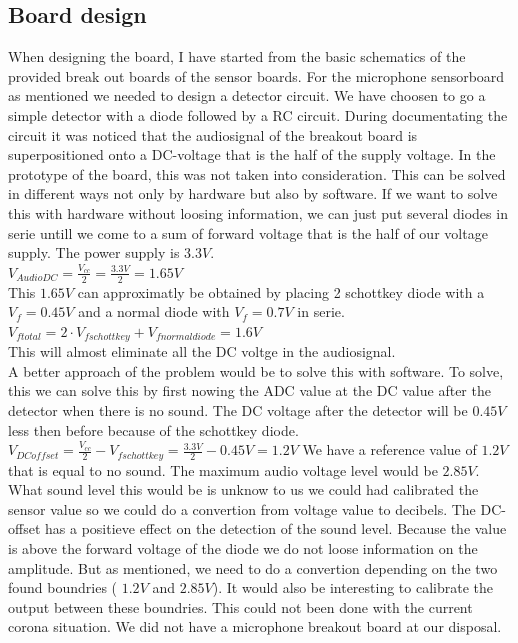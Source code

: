 \documentclass[11pt,a4paper]{article}
\begin{document}
\subsection{Board design}
When designing the board, I have started from the basic schematics of the provided break out boards of the sensor boards. For the microphone sensorboard as mentioned we needed to design a detector circuit. We have choosen to go a simple detector with a diode followed by a RC circuit. During documentating the circuit it was noticed that the audiosignal of the breakout board is superpositioned onto a DC-voltage that is the half of the supply voltage. In the prototype of the board, this was not taken into consideration. This can be solved in different ways not only by hardware but also by software. If we want to solve this with hardware without loosing information, we can just put several diodes in serie untill we come to a sum of forward voltage that is the half of our voltage supply. The power supply is $3.3 V$. \\
$V_{Audio DC} = \frac{V_{cc}}{2}= \frac{3.3V}{2} = 1.65V$\\
This $1.65 V$ can approximatly be obtained by placing 2 schottkey diode with a $V_{f}=0.45 V$ and a normal diode with $V_{f} = 0.7 V$ in serie.\\
$V_{f total} = 2\cdot V_{f schottkey} + V_{f normal diode} = 1.6 V$\\
This will almost eliminate all the DC voltge in the audiosignal. \\
A better approach of the problem would be to solve this with software. To solve, this we can solve this by first nowing the ADC value at the DC value after the detector when there is no sound. The DC voltage after the detector will be $0.45 V$ less then before because of the schottkey diode.\\
$V_{DC offset} = \frac{V_{cc}}{2}-V_{f schottkey}= \frac{3.3 V}{2}- 0.45 V = 1.2 V$
We have a reference value of $1.2 V$ that is equal to no sound. The maximum audio voltage level would be $2.85 V$. What sound level this would be is unknow to us we could had calibrated the sensor value so we could do a convertion from voltage value to decibels. The DC-offset has a positieve effect on the detection of the sound level. Because the value is above the forward voltage of the diode we do not loose information on the amplitude. But as mentioned, we need to do a convertion depending on the two found boundries ( $1.2 V$ and $2.85 V$). It would also be interesting to calibrate the output between these boundries. This could not been done with the current corona situation. We did not have a microphone breakout board at our disposal.
\end{document}
